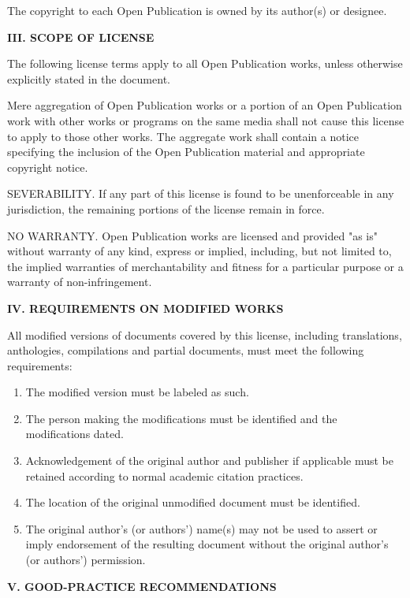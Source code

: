 The copyright to each Open Publication is owned by its author(s) or
designee.

{\bf III. SCOPE OF LICENSE}

The following license terms apply to all Open Publication works, unless
otherwise explicitly stated in the document.

Mere aggregation of Open Publication works or a portion of an Open
Publication work with other works or programs on the same media shall
not cause this license to apply to those other works. The aggregate work
shall contain a notice specifying the inclusion of the Open Publication
material and appropriate copyright notice.

SEVERABILITY. If any part of this license is found to be unenforceable
in any jurisdiction, the remaining portions of the license remain in
force.

NO WARRANTY. Open Publication works are licensed and provided "as is"
without warranty of any kind, express or implied, including, but not
limited to, the implied warranties of merchantability and fitness for a
particular purpose or a warranty of non-infringement.

{\bf IV. REQUIREMENTS ON MODIFIED WORKS}

All modified versions of documents covered by this license, including
translations, anthologies, compilations and partial documents, must meet
the following requirements:

\begin{enumerate}
 \item The modified version must be labeled as such.

 \item The person making the modifications must be identified and the
 modifications dated.

 \item Acknowledgement of the original author and publisher if
 applicable must be retained according to normal academic citation
 practices.

 \item The location of the original unmodified document must be
 identified.

 \item The original author's (or authors') name(s) may not be used to
 assert or imply endorsement of the resulting document without the
 original author's (or authors') permission.
\end{enumerate}

{\bf V. GOOD-PRACTICE RECOMMENDATIONS}

